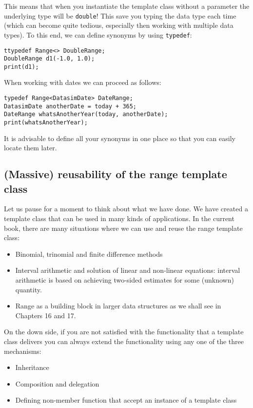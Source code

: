 This means that when you instantiate the template class without a parameter the underlying type will be \texttt{double}! This save you typing the data type each time (which can become quite tedious, especially then working with multiple data types). To this end, we can define synonyms by using \texttt{typedef}:
\begin{lstlisting}
ttypedef Range<> DoubleRange;
DoubleRange d1(-1.0, 1.0);
print(d1);
\end{lstlisting}
When working with dates we can proceed as follows:
\begin{lstlisting}
typedef Range<DatasimDate> DateRange;
DatasimDate anotherDate = today + 365;
DateRange whatsAnotherYear(today, anotherDate);
print(whatsAnotherYear);
\end{lstlisting}
It is advisable to define all your synonyms in one place so that you can easily locate them later.
\subsection{(Massive) reusability of the range template class}

Let us pause for a moment to think about what we have done. We have created a template class that can be used in many kinds of applications. In the current book, there are many situations where we can use and reuse the range template class:
\begin{itemize}
	\item Binomial, trinomial and finite difference methods
	\item Interval arithmetic and solution of linear and non-linear equations: interval arithmetic is based on achieving two-sided estimates for some (unknown) quantity.
	\item Range as a building block in larger data structures as we shall see in Chapters 16 and 17.
\end{itemize}
On the down side, if you are not satisfied with the functionality that a template class delivers you can always extend the functionality using any one of the three mechanisms:
\begin{itemize}
	\item Inheritance
	\item Composition and delegation
	\item Defining non-member function that accept an instance of a template class
\end{itemize}

